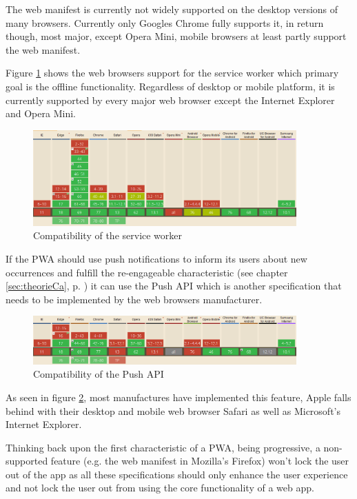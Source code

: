 The web manifest is currently not widely supported on the desktop versions of many browsers. Currently only Googles Chrome fully supports it, in return though, most major, except Opera Mini, mobile browsers at least partly support the web manifest. 

Figure \ref{fig:pwa_comptaibility_serviceworker} shows the web browsers support for the service worker which primary goal is the offline functionality. Regardless of desktop or mobile platform, it is currently supported by every major web browser except the Internet Explorer and Opera Mini.

\begin{figure}[htbp] 
	\centering
	\includegraphics[width=0.9\textwidth]{Assets/chapter_pwa/serviceworkersupport.PNG}
	\caption{Compatibility of the service worker}
	\label{fig:pwa_comptaibility_serviceworker}
\end{figure}

If the PWA should use push notifications to inform its users about new occurrences and fulfill the re-engageable characteristic (see chapter \ref{sec:theorieCa}, p. \pageref{sec:theorieCa}) it can use the Push API which is another specification that needs to be implemented by the web browsers manufacturer.

\begin{figure}[htbp] 
	\centering
	\includegraphics[width=0.9\textwidth]{Assets/chapter_pwa/pushapisupport.PNG}
	\caption{Compatibility of the Push API}
	\label{fig:pwa_comptaibility_pushapi}
\end{figure}

As seen in figure \ref{fig:pwa_comptaibility_pushapi}, most manufactures have implemented this feature, Apple falls behind with their desktop and mobile web browser Safari as well as Microsoft’s Internet Explorer.

Thinking back upon the first characteristic of a PWA, being progressive, a non-supported feature (e.g. the web manifest in Mozilla's Firefox) won’t lock the user out of the app as all these specifications should only enhance the user experience and not lock the user out from using the core functionality of a web app.